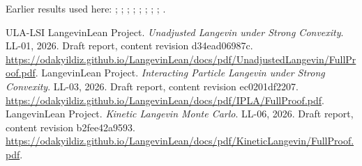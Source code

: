 \documentclass[11pt,a4paper]{article}
\begin{document}
Earlier results used here: \cite[Section~3.26.3]{LangevinLean2026ULASC}; \cite[Section~3.1.1]{LangevinLean2026IPLA}; \cite[Section~3.1.4]{LangevinLean2026IPLA}; \cite[Section~3.3.2]{LangevinLean2026IPLA}; \cite[Section~3.5.1]{LangevinLean2026IPLA}; \cite[Section~3.113.3]{LangevinLean2026Kinetic}; \cite[Section~3.20.1]{LangevinLean2026Kinetic}; \cite[Section~3.20.5]{LangevinLean2026Kinetic}; \cite[Section~3.51.2]{LangevinLean2026Kinetic}.

\begin{thebibliography}{ULA-LSI}
LangevinLean Project. \emph{Unadjusted Langevin under Strong Convexity}. LL-01, 2026. Draft report, content revision d34ead06987c. \url{https://odakyildiz.github.io/LangevinLean/docs/pdf/UnadjustedLangevin/FullProof.pdf}.
LangevinLean Project. \emph{Interacting Particle Langevin under Strong Convexity}. LL-03, 2026. Draft report, content revision ec0201df2207. \url{https://odakyildiz.github.io/LangevinLean/docs/pdf/IPLA/FullProof.pdf}.
LangevinLean Project. \emph{Kinetic Langevin Monte Carlo}. LL-06, 2026. Draft report, content revision b2fee42a9593. \url{https://odakyildiz.github.io/LangevinLean/docs/pdf/KineticLangevin/FullProof.pdf}.
\end{thebibliography}
\end{document}
